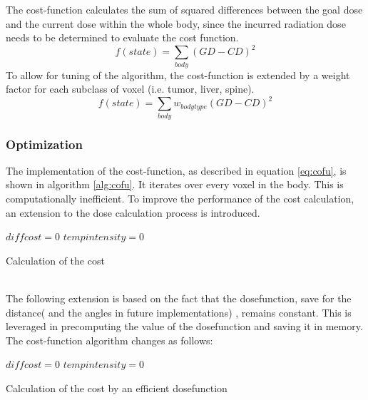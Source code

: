 \documentclass[12pt]{article}
\begin{document}
The cost-function calculates the sum of squared differences between the goal dose and the current dose within the whole body, since the incurred radiation dose needs to be determined to evaluate the cost function.
 \begin{equation}
 f(state) = \sum_{body}(GD-CD)^2
 \end{equation}
 To allow for tuning of the algorithm, the cost-function is extended by a weight factor for each subclass of voxel (i.e. tumor, liver, spine).
 \begin{equation}
 \label{eq:cofu}
 f(state) = \sum_{body}w_{bodytype}(GD-CD)^2
 \end{equation}

\subsubsection{Optimization}
\label{subsubsec:SAoptimization}
The implementation of the cost-function, as described in equation \eqref{eq:cofu}, is shown in algorithm \ref{alg:cofu}. It iterates over every voxel in the body. This is computationally inefficient. To improve the performance of the cost calculation, an extension to the dose calculation process is introduced. \\

\begin{algorithm}[H]
\label{alg:cofu}
 $diffcost=0$\;
 $tempintensity=0$\;
 
 \;
 \caption{Calculation of the cost}
 
 \end{algorithm}
 
 ~\\ The following extension is based on the fact that the dosefunction, save for the distance( and the angles in future implementations) , remains constant. This is leveraged in precomputing the value of the dosefunction and saving it in memory. The cost-function algorithm changes as follows: \\

\begin{algorithm}[H]
\label{alg:cofu2}
 $diffcost=0$\;
 $tempintensity=0$\;
 
 \;
 \caption{Calculation of the cost by an efficient dosefunction}
 
 \end{algorithm}
 
\end{document}

